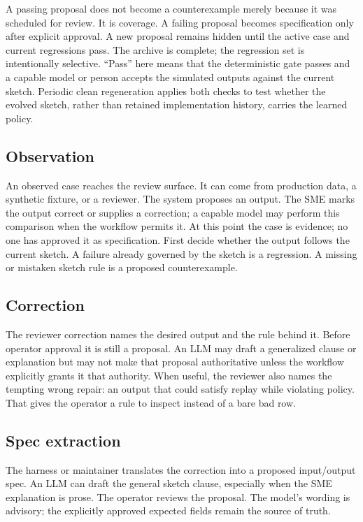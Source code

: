 \documentclass[11pt]{article}
\begin{document}
A passing proposal does not become a counterexample merely because it was scheduled for review.
It is coverage.  A failing proposal becomes specification only after explicit approval.  A new
proposal remains hidden until the active case and current regressions pass.  The archive is
complete; the regression set is intentionally selective.  ``Pass'' here means that the
deterministic gate passes and a capable model or person accepts the simulated outputs against the
current sketch.  Periodic clean regeneration applies both checks to test whether the evolved
sketch, rather than retained implementation history, carries the learned policy.

\subsection{Observation}

An observed case reaches the review surface.  It can come from production data, a synthetic
fixture, or a reviewer.  The system proposes an output.  The SME marks the output correct or
supplies a correction; a capable model may perform this comparison when the workflow permits it.
At this point the case is evidence; no one has approved it as specification.  First decide
whether the output follows the current sketch.  A failure already governed by the sketch is a
regression.  A missing or mistaken sketch rule is a proposed counterexample.

\subsection{Correction}

The reviewer correction names the desired output and the rule behind it.  Before operator
approval it is still a proposal.  An LLM may draft a generalized clause or explanation but may
not make that proposal authoritative unless the workflow explicitly grants it that authority.
When useful, the reviewer also names the tempting wrong repair: an output
that could satisfy replay while violating policy.  That gives the operator a rule to inspect
instead of a bare bad row.

\subsection{Spec extraction}

The harness or maintainer translates the correction into a proposed input/output spec.  An LLM
can draft the general sketch clause, especially when the SME explanation is prose.  The operator
reviews the proposal.  The model's wording is advisory; the explicitly approved expected fields
remain the source of truth.
\end{document}
